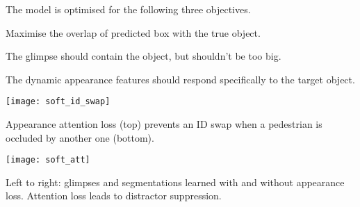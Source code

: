 


The model is optimised for the following three objectives.
\begin{description}[leftmargin=\parindent,labelsep=1em]
	
	\item[Main Tracking Objective:] Maximise the overlap of predicted box with the true object.
	
	\item[Spatial Attention:] The glimpse should contain the object, but shouldn't be too big.
	
	\item[Appearance Attention:] The dynamic appearance features should respond specifically to the target object.
	
	
\end{description}


\vspace{.5\baselineskip}
\centering
\begin{minipage}[c]{.4\textwidth}
    \centering
    \texttt{[image: soft\_id\_swap]}
    \caption*{\large Appearance attention loss (top) prevents an ID swap when a pedestrian is occluded by another one (bottom).}
\end{minipage}
\begin{minipage}[c]{.4\textwidth}
    \centering
    \texttt{[image: soft\_att]}
   \caption*{\large Left to right: glimpses and segmentations learned with and without appearance loss.
   Attention loss leads to distractor suppression.} 
\end{minipage}